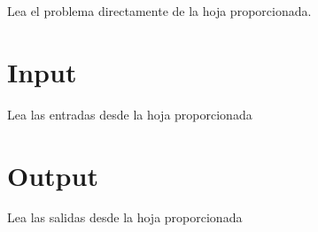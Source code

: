 Lea el problema directamente de la hoja proporcionada.
\section*{Input}
Lea las entradas desde la hoja proporcionada
\section*{Output}
Lea las salidas desde la hoja proporcionada
